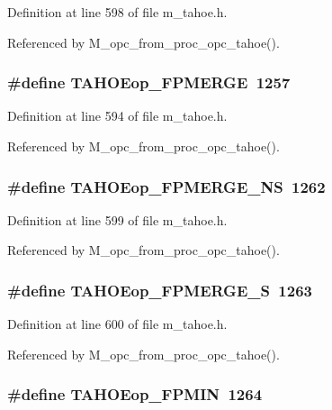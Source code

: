 Definition at line 598 of file m\_\-tahoe.h.

Referenced by M\_\-opc\_\-from\_\-proc\_\-opc\_\-tahoe().
\subsubsection{\setlength{\rightskip}{0pt plus 5cm}\#define TAHOEop\_\-FPMERGE~1257}\label{m__tahoe_8h_de323f36eebfa78e4a0ae209d9bdeda4}




Definition at line 594 of file m\_\-tahoe.h.

Referenced by M\_\-opc\_\-from\_\-proc\_\-opc\_\-tahoe().
\subsubsection{\setlength{\rightskip}{0pt plus 5cm}\#define TAHOEop\_\-FPMERGE\_\-NS~1262}\label{m__tahoe_8h_fa654362f01338562089a992e407bf7c}




Definition at line 599 of file m\_\-tahoe.h.

Referenced by M\_\-opc\_\-from\_\-proc\_\-opc\_\-tahoe().
\subsubsection{\setlength{\rightskip}{0pt plus 5cm}\#define TAHOEop\_\-FPMERGE\_\-S~1263}\label{m__tahoe_8h_abd97b2445bae308a3eaeef8558e6984}




Definition at line 600 of file m\_\-tahoe.h.

Referenced by M\_\-opc\_\-from\_\-proc\_\-opc\_\-tahoe().
\subsubsection{\setlength{\rightskip}{0pt plus 5cm}\#define TAHOEop\_\-FPMIN~1264}\label{m__tahoe_8h_1d1061ff4fc208419e0986a51698a2f3}




